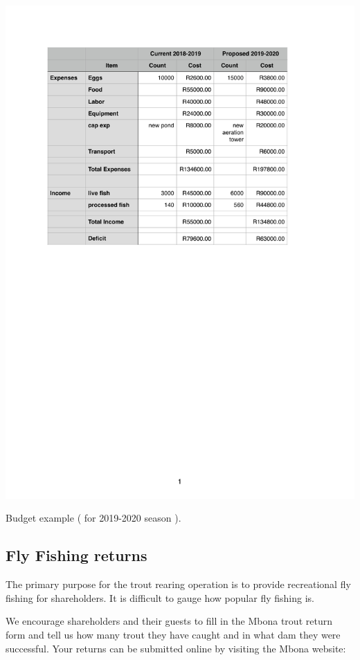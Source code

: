 \begin{table}[H]
  \centering
  \includegraphics[scale = 0.9]{tables/TablesBudget.pdf}
   \caption{Budget example ( for 2019-2020 season ).}
  \label{tab:Budget}
\end{table}
 

\subsection{Fly Fishing returns}

The primary purpose for the trout rearing operation is to provide recreational
fly fishing for shareholders. It is difficult to gauge how popular fly fishing is. 

We encourage shareholders
and their guests to fill in the Mbona trout return form and tell us how many trout they have
caught and in what dam they were successful. Your returns can be submitted online
by visiting the Mbona website: 


